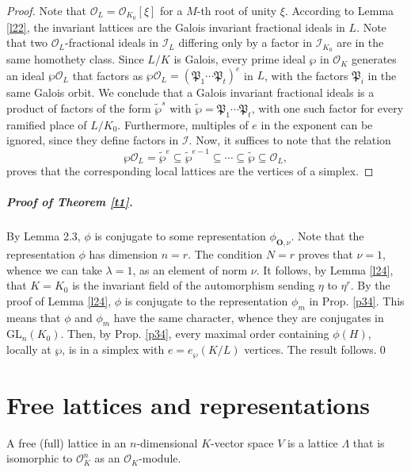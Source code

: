 \documentclass{article}
\theoremstyle{definition}
\begin{document}
\begin{proof}
    Note that 
    $\mathcal{O}_L=\mathcal{O}_{K_0}[\xi]$ for
    a $M$-th root of unity $\xi$.
    According to Lemma \ref{l22}, the invariant lattices are the Galois invariant fractional 
    ideals in $L$. Note that two 
    $\mathcal{O}_L$-fractional ideals in
    $\mathcal{I}_L$
    differing only by a factor in 
    $\mathcal{I}_{K_0}$
    are in the same homothety class.
    Since $L/K$ is Galois, every prime ideal $\wp$ 
    in $\mathcal{O}_K$ generates an ideal $\wp\mathcal{O}_L$ that factors 
    as $\wp\mathcal{O}_L=(\mathfrak{P}_1\cdots\mathfrak{P}_t)^e$
    in $L$, with the factors $\mathfrak{P}_i$
    in the same Galois orbit. 
    We conclude that a Galois invariant fractional 
    ideals is a product of factors of the form $\tilde{\wp}^s$ with
    $\tilde{\wp}=\mathfrak{P}_1\cdots\mathfrak{P}_t$, with one such factor for every
    ramified place of $L/K_0$.
    Furthermore, multiples of $e$ in the exponent
    can be ignored, since they define factors
    in $\mathcal{I}$. Now, it suffices to 
    note that the relation 
    $$\wp\mathcal{O}_L=\tilde{\wp}^e\subseteq\tilde{\wp}^{e-1}\subseteq\cdots
    \subseteq\tilde{\wp}\subseteq\mathcal{O}_L,$$
    proves that the corresponding local lattices are the vertices 
    of a simplex.
\end{proof}

\subparagraph{Proof of Theorem \ref{t1}.}
By Lemma 2.3, $\phi$ is conjugate to some representation $\phi_{\mathbf{O},\nu}$.
Note that the representation 
$\phi$ has dimension $n=r$. 
The condition $N=r$ proves that $\nu=1$, whence
we can take $\lambda=1$, as an element of norm
$\nu$. It follows, by Lemma \ref{l24}, that $K=K_0$ 
is the invariant field of the automorphism sending $\eta$ 
to $\eta^r$. By the proof of Lemma \ref{l24}, $\phi$ is 
conjugate to the representation $\phi_m$ in Prop. \ref{p34}.
This means that $\phi$ and $\phi_m$ have the same character,
whence they are conjugates in $\mathrm{GL}_n(K_0)$.
Then, by Prop. \ref{p34}, every maximal
order containing $\phi(H)$, locally at $\wp$,
is in a simplex with $e=e_\wp(K/L)$ vertices. 
The result follows.\qed



\section{Free lattices and representations}\label{secfl}

A free (full) lattice in an $n$-dimensional
$K$-vector space $V$ is a lattice $\Lambda$
that is isomorphic to $\mathcal{O}_K^n$ as
an $\mathcal{O}_K$-module.
\end{document}
